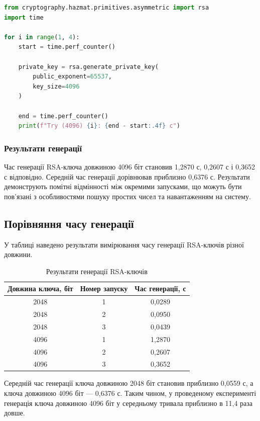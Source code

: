 \begin{lstlisting}[language=Python]
from cryptography.hazmat.primitives.asymmetric import rsa
import time

for i in range(1, 4):
    start = time.perf_counter()

    private_key = rsa.generate_private_key(
        public_exponent=65537,
        key_size=4096
    )

    end = time.perf_counter()
    print(f"Try (4096) {i}: {end - start:.4f} c")
\end{lstlisting}

\subsubsection{Результати генерації}

Час генерації RSA-ключа довжиною 4096 біт становив 1,2870 с, 0,2607 с і 0,3652 с відповідно. Середній час генерації дорівнював приблизно 0,6376 с. Результати демонструють помітні відмінності між окремими запусками, що можуть бути пов'язані з особливостями пошуку простих чисел та навантаженням на систему.

\subsection{Порівняння часу генерації}

У таблиці наведено результати вимірювання часу генерації RSA-ключів різної довжини.

\begin{table}[H]
\centering
\caption{Результати генерації RSA-ключів}
\label{tab:rsa_generation}
\begin{tabular}{|c|c|c|}
\hline
\textbf{Довжина ключа, біт} &
\textbf{Номер запуску} &
\textbf{Час генерації, с} \\
\hline
2048 & 1 & 0,0289 \\
\hline
2048 & 2 & 0,0950 \\
\hline
2048 & 3 & 0,0439 \\
\hline
4096 & 1 & 1,2870 \\
\hline
4096 & 2 & 0,2607 \\
\hline
4096 & 3 & 0,3652 \\
\hline
\end{tabular}
\end{table}

Середній час генерації ключа довжиною 2048 біт становив приблизно 0,0559 с, а ключа довжиною 4096 біт — 0,6376 с. Таким чином, у проведеному експерименті генерація ключа довжиною 4096 біт у середньому тривала приблизно в 11,4 раза довше.


